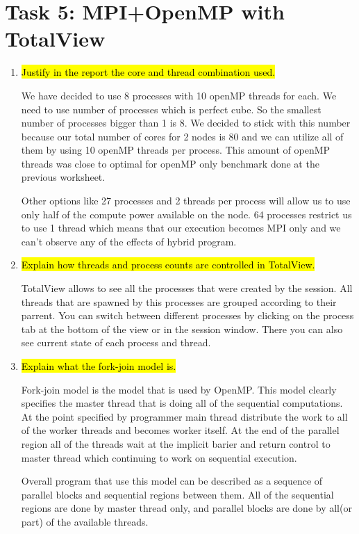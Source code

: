 \documentclass{article}
\begin{document}
\section{Task 5: MPI+OpenMP with TotalView}
\begin{enumerate}
	\item \hl{Justify in the report the core and thread combination used.} ~

	We have decided to use 8 processes with 10 openMP threads for each. We need to
	use number of processes which is perfect cube. So the smallest number of processes bigger
	than 1 is 8. We decided to stick with this number because our total number of cores for 
	2 nodes is 80 and we can utilize all of them by using 10 openMP threads per process.
	This amount of openMP threads was close to optimal for openMP only benchmark done at the
	previous worksheet.
	
	Other options like 27 processes and 2 threads per process will allow us to use only half
	of the compute power available on the node. 64 processes restrict us to use 1 thread which
	means that our execution becomes MPI only and we can't observe any of the effects of hybrid
	program.

	\item \hl{Explain how threads and process counts are controlled in TotalView.} ~

	TotalView allows to see all the processes that were created by the session. All threads
	that are spawned by this processes are grouped according to their parrent. You can switch between
	different processes by clicking on the process tab at the bottom of the view or in the session
	window. There you can also see current state of each process and thread.

	\item \hl{Explain what the fork-join model is.} ~

	Fork-join model is the model that is used by OpenMP. This model clearly specifies the master
	thread that is doing all of the sequential computations. At the point specified by programmer
	main thread distribute the work to all of the worker threads and becomes worker itself.
	At the end of the parallel region all of the threads wait at the implicit barier and 
	return control to master thread which continuing to work on sequential execution. 
	
	Overall program
	that use this model can be described as a sequence of parallel blocks and sequential regions
	between them. All of the sequential regions are done by master thread only, and parallel
	blocks are done by all(or part) of the available threads.


\end{enumerate}
\end{document}

